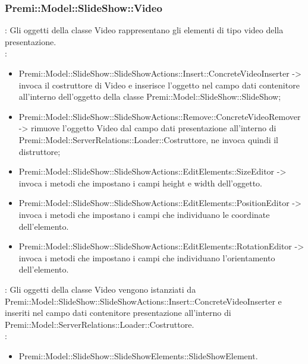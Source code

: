 {                    \subsubsection{Premi::Model::SlideShow::Video}{
				\textbf{\tipo}: Gli oggetti della classe Video rappresentano gli elementi di tipo video della presentazione.\\
				\textbf{\relaz}: 
				\begin{itemize}
					\item Premi::Model::SlideShow::SlideShowActions::Insert::ConcreteVideoInserter -> invoca il costruttore di Video e inserisce l’oggetto nel campo dati contenitore all’interno dell’oggetto della classe Premi::Model::SlideShow::SlideShow;
                    \item Premi::Model::SlideShow::SlideShowActions::Remove::ConcreteVideoRemover -> rimuove l’oggetto Video dal campo dati presentazione all’interno di Premi::Model::ServerRelations::Loader::Costruttore, ne invoca quindi il distruttore;
                     \item Premi::Model::SlideShow::SlideShowActions::EditElements::SizeEditor -> invoca i metodi che impostano i campi height e width dell'oggetto.
                    \item Premi::Model::SlideShow::SlideShowActions::EditElements::PositionEditor -> invoca i metodi che impostano i campi che individuano le coordinate dell'elemento.
                    \item Premi::Model::SlideShow::SlideShowActions::EditElements::RotationEditor -> invoca i metodi che impostano i campi che individuano l'orientamento dell'elemento.
				\end{itemize}	
                \textbf{\interfacce}: Gli oggetti della classe Video vengono istanziati da Premi::Model::SlideShow::SlideShowActions::Insert::ConcreteVideoInserter e inseriti nel campo dati contenitore presentazione all’interno di Premi::Model::ServerRelations::Loader::Costruttore.\\
                \textbf{\base}: 
                    \begin{itemize}
                    \item Premi::Model::SlideShow::SlideShowElements::SlideShowElement.
                    \end{itemize}
                    }     
}
